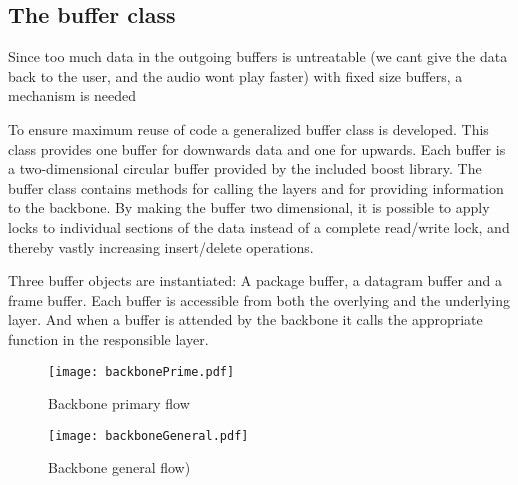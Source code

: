 \subsection{The buffer class}


Since too much data in the outgoing buffers is untreatable (we cant give the data back to the user, and the audio wont play faster) with fixed size buffers, a mechanism is needed


To ensure maximum reuse of code a generalized buffer class is developed. This class provides one buffer for downwards data and one for upwards. Each buffer is a two-dimensional circular buffer provided by the included boost library. The buffer class contains methods for calling the layers and for providing information to the backbone.
By making the buffer two dimensional, it is possible to apply locks to individual sections of the data instead of a complete read/write lock, and thereby vastly increasing insert/delete operations.

Three  buffer objects are instantiated: A package buffer, a datagram buffer and a frame buffer. Each buffer is accessible from both the overlying and the underlying layer. And when a buffer is attended by the backbone it calls the appropriate function in the responsible layer.










\begin{figure}[htb]
	\begin{center}
	\texttt{[image: backbonePrime.pdf]}
	\caption{Backbone primary flow}
	\label{fig:backboneprime}	
	\end{center}
\end{figure}


\begin{figure}[htb]
	\begin{center}
	\texttt{[image: backboneGeneral.pdf]}
	\caption{Backbone general flow)}
	\label{fig:backbonegeneralt}	
	\end{center}
\end{figure}
